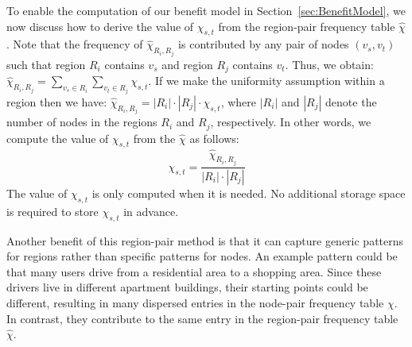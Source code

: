 \documentclass{sig-alternate}
\newcommand{\spath}{SP\xspace}
\begin{document}
To enable the computation of our benefit model in Section~\ref{sec:BenefitModel},
we now discuss how to derive the value of $\chi_{s,t}$ from the region-pair frequency table $\widehat{\chi}$.
Note that the frequency of $\widehat{\chi}_{R_i,R_j}$ is contributed by
any pair of nodes $(v_s,v_t)$ such that region $R_i$ contains $v_s$ and region $R_j$ contains $v_t$.
Thus, we obtain: $\widehat{\chi}_{R_i,R_j} = \sum_{v_s \in R_i} \sum_{v_t \in R_j} \chi_{s,t}$.
If we make the uniformity assumption within a region then we have:
$\widehat{\chi}_{R_i,R_j} = |R_i| \cdot |R_j| \cdot \chi_{s,t}$,
where $|R_i|$ and $|R_j|$ denote the number of nodes in the regions $R_i$ and $R_j$, respectively.
In other words, we compute the value of $\chi_{s,t}$ from the $\widehat{\chi}$ as follows:
\begin{equation} \label{eq:chi}
\chi_{s,t} = \frac{\widehat{\chi}_{R_i,R_j}}{|R_i| \cdot |R_j|}
\end{equation}
The value of $\chi_{s,t}$ is only computed when it is needed.
No additional storage space is required to store $\chi_{s,t}$ in advance.




Another benefit of this region-pair method is that
it can capture generic patterns for regions rather than specific patterns for nodes.
An example pattern could be that many users drive from a residential area to a shopping area.
Since these drivers live in different apartment buildings, their starting points could be different,
resulting in many dispersed entries in the node-pair frequency table $\chi$.
In contrast, they contribute to the same entry in the region-pair frequency table $\widehat{\chi}$.





\end{document}
